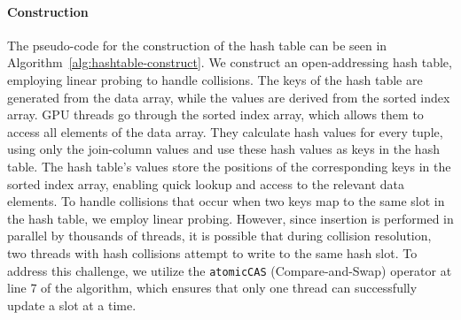 \documentclass[nonacm,sigplan]{acmart}
\begin{document}
\paragraph*{Construction} 
The pseudo-code for the construction of the hash table can be seen in Algorithm~\ref{alg:hashtable-construct}. We construct an open-addressing hash table, employing linear probing to handle collisions. The keys of the hash table are generated from the data array, while the values are derived from the sorted index array. 
GPU threads go through the sorted index array, which allows them to access all elements of the data array. They calculate hash values for every tuple, using only the join-column values and use these hash values as keys in the hash table. The hash table's values store the positions of the corresponding keys in the sorted index array, enabling quick lookup and access to the relevant data elements.
To handle collisions that occur when two keys map to the same slot in the hash table, we employ linear probing. However, since insertion is performed in parallel by thousands of threads, it is possible that during collision resolution, two threads with hash collisions attempt to write to the same hash slot.
To address this challenge, we utilize the \texttt{atomicCAS} (Compare-and-Swap) operator at line 7 of the algorithm, which ensures that only one thread can successfully update a slot at a time.
\end{document}
